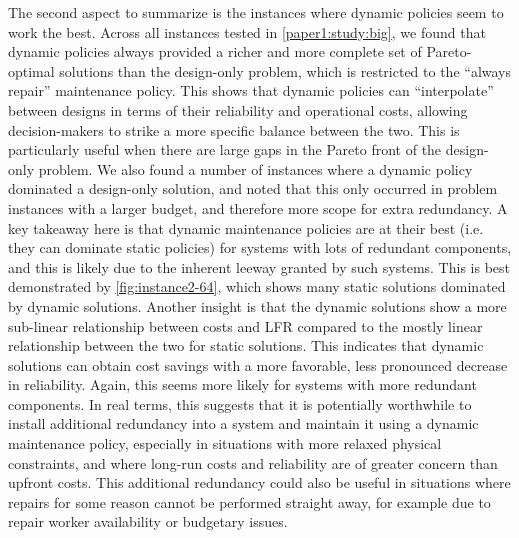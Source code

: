 \documentclass[11pt,authoryear,a4paper]{article}
\theoremstyle{definition}
\begin{document}
{The second aspect to summarize is the instances where dynamic policies seem to work the best. Across all instances tested in \autoref{paper1:study:big}, we found that dynamic policies always provided a richer and more complete set of Pareto-optimal solutions than the design-only problem, which is restricted to the ``always repair'' maintenance policy. This shows that dynamic policies can ``interpolate'' between designs in terms of their reliability and operational costs, allowing decision-makers to strike a more specific balance between the two. This is particularly useful when there are large gaps in the Pareto front of the design-only problem. We also found a number of instances where a dynamic policy dominated a design-only solution, and noted that this only occurred in problem instances with a larger budget, and therefore more scope for extra redundancy. {\color{black} A key takeaway here is that dynamic maintenance policies are at their best (i.e. they can dominate static policies) for systems with lots of redundant components, and this is likely due to the inherent leeway granted by such systems. This is best demonstrated by \autoref{fig:instance2-64}, which shows many static solutions dominated by dynamic solutions. Another insight is that the dynamic solutions show a more sub-linear relationship between costs and LFR compared to the mostly linear relationship between the two for static solutions. This indicates that dynamic solutions can obtain cost savings with a more favorable, less pronounced decrease in reliability. Again, this seems more likely for systems with more redundant components.} In real terms, this suggests that it is potentially worthwhile to install additional redundancy into a system and maintain it using a dynamic maintenance policy, especially in situations with more relaxed physical constraints, and where long-run costs and reliability are of greater concern than upfront costs. {\color{black} This additional redundancy could also be useful in situations where repairs for some reason cannot be performed straight away, for example due to repair worker availability or budgetary issues.} %

}
\end{document}

